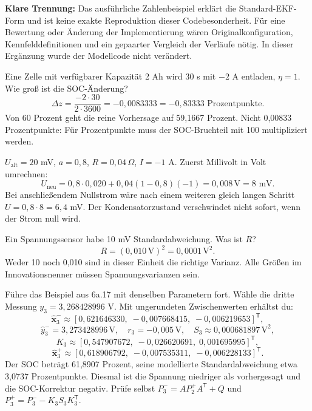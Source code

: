 \textbf{Klare Trennung:} Das ausführliche Zahlenbeispiel erklärt die Standard-EKF-Form und ist keine exakte Reproduktion dieser Codebesonderheit. Für eine Bewertung oder Änderung der Implementierung wären Originalkonfiguration, Kennfelddefinitionen und ein gepaarter Vergleich der Verläufe nötig. In dieser Ergänzung wurde der Modellcode nicht verändert.

Eine Zelle mit verfügbarer Kapazität 2 Ah wird 30 s mit $-2$ A entladen, $\eta=1$. Wie groß ist die SOC-Änderung?
\[
\Delta z=\frac{-2\cdot30}{2\cdot3600}=-0{,}0083333
=-0{,}83333\text{ Prozentpunkte}.
\]
Von 60 Prozent geht die reine Vorhersage auf 59,1667 Prozent. Nicht 0,00833 Prozentpunkte: Für Prozentpunkte muss der SOC-Bruchteil mit 100 multipliziert werden.

$U_{\mathrm{alt}}=20$ mV, $a=0{,}8$, $R=0{,}04\,\Omega$, $I=-1$ A. Zuerst Millivolt in Volt umrechnen:
\[
U_{\mathrm{neu}}=0{,}8\cdot0{,}020+0{,}04(1-0{,}8)(-1)
=0{,}008\,\mathrm V=8\text{ mV}.
\]
Bei anschließendem Nullstrom wäre nach einem weiteren gleich langen Schritt $U=0{,}8\cdot8=6{,}4$ mV. Der Kondensatorzustand verschwindet nicht sofort, wenn der Strom null wird.

Ein Spannungssensor habe 10 mV Standardabweichung. Was ist $R$?
\[
R=(0{,}010\,\mathrm V)^2=0{,}0001\,\mathrm V^2.
\]
Weder 10 noch 0,010 sind in dieser Einheit die richtige Varianz. Alle Größen im Innovationsnenner müssen Spannungsvarianzen sein.

Führe das Beispiel aus 6a.17 mit denselben Parametern fort. Wähle die dritte Messung $y_3=3{,}268428996$ V. Mit ungerundeten Zwischenwerten erhältst du:
\[
\hat{\mathbf x}_3^-\approx[0{,}621646330,\;-0{,}007668415,\;-0{,}006219653]^{\mathsf T},
\]
\[
\hat y_3^-=3{,}273428996\,\mathrm V,\quad r_3=-0{,}005\,\mathrm V,
\quad S_3\approx0{,}000681897\,\mathrm V^2,
\]
\[
K_3\approx[0{,}547907672,\;-0{,}026620691,\;0{,}001695995]^{\mathsf T},
\]
\[
\hat{\mathbf x}_3^+\approx[0{,}618906792,\;-0{,}007535311,\;-0{,}006228133]^{\mathsf T}.
\]
Der SOC beträgt 61,8907 Prozent, seine modellierte Standardabweichung etwa 3,0737 Prozentpunkte. Diesmal ist die Spannung niedriger als vorhergesagt und die SOC-Korrektur negativ. Prüfe selbst $P_3^-=AP_2^+A^{\mathsf T}+Q$ und $P_3^+=P_3^- -K_3S_3K_3^{\mathsf T}$.

